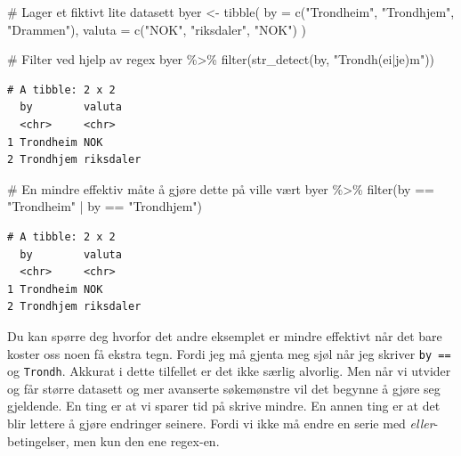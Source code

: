 \documentclass[
  letterpaper,
  DIV=11,
  numbers=noendperiod]{scrreprt}
\newenvironment{Shaded}{\begin{snugshade}}{\end{snugshade}}
\newcommand{\AttributeTok}[1]{\textcolor[rgb]{0.40,0.45,0.13}{#1}}
\newcommand{\CommentTok}[1]{\textcolor[rgb]{0.37,0.37,0.37}{#1}}
\newcommand{\FunctionTok}[1]{\textcolor[rgb]{0.28,0.35,0.67}{#1}}
\newcommand{\NormalTok}[1]{\textcolor[rgb]{0.00,0.23,0.31}{#1}}
\newcommand{\OtherTok}[1]{\textcolor[rgb]{0.00,0.23,0.31}{#1}}
\newcommand{\SpecialCharTok}[1]{\textcolor[rgb]{0.37,0.37,0.37}{#1}}
\newcommand{\StringTok}[1]{\textcolor[rgb]{0.13,0.47,0.30}{#1}}
\begin{document}
\begin{Shaded}
\begin{Highlighting}[]
\CommentTok{\# Lager et fiktivt lite datasett}
\NormalTok{byer }\OtherTok{\textless{}{-}} \FunctionTok{tibble}\NormalTok{(}
  \AttributeTok{by =} \FunctionTok{c}\NormalTok{(}\StringTok{"Trondheim"}\NormalTok{, }\StringTok{"Trondhjem"}\NormalTok{, }\StringTok{"Drammen"}\NormalTok{),}
  \AttributeTok{valuta =} \FunctionTok{c}\NormalTok{(}\StringTok{"NOK"}\NormalTok{, }\StringTok{"riksdaler"}\NormalTok{, }\StringTok{"NOK"}\NormalTok{)}
\NormalTok{)}

\CommentTok{\# Filter ved hjelp av regex}
\NormalTok{byer }\SpecialCharTok{\%\textgreater{}\%} 
  \FunctionTok{filter}\NormalTok{(}\FunctionTok{str\_detect}\NormalTok{(by, }\StringTok{"Trondh(ei|je)m"}\NormalTok{))}
\end{Highlighting}
\end{Shaded}

\begin{verbatim}
# A tibble: 2 x 2
  by        valuta   
  <chr>     <chr>    
1 Trondheim NOK      
2 Trondhjem riksdaler
\end{verbatim}

\begin{Shaded}
\begin{Highlighting}[]
\CommentTok{\# En mindre effektiv måte å gjøre dette på ville vært}
\NormalTok{byer }\SpecialCharTok{\%\textgreater{}\%} 
  \FunctionTok{filter}\NormalTok{(by }\SpecialCharTok{==} \StringTok{"Trondheim"} \SpecialCharTok{|}\NormalTok{ by }\SpecialCharTok{==} \StringTok{"Trondhjem"}\NormalTok{)}
\end{Highlighting}
\end{Shaded}

\begin{verbatim}
# A tibble: 2 x 2
  by        valuta   
  <chr>     <chr>    
1 Trondheim NOK      
2 Trondhjem riksdaler
\end{verbatim}

Du kan spørre deg hvorfor det andre eksemplet er mindre effektivt når
det bare koster oss noen få ekstra tegn. Fordi jeg må gjenta meg sjøl
når jeg skriver \texttt{by\ ==} og \texttt{Trondh}. Akkurat i dette
tilfellet er det ikke særlig alvorlig. Men når vi utvider og får større
datasett og mer avanserte søkemønstre vil det begynne å gjøre seg
gjeldende. En ting er at vi sparer tid på skrive mindre. En annen ting
er at det blir lettere å gjøre endringer seinere. Fordi vi ikke må endre
en serie med \emph{eller}-betingelser, men kun den ene regex-en.
\end{document}
